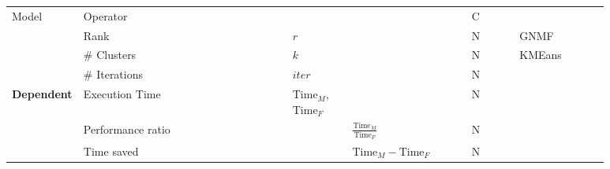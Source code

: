 \begin{tabular}{lp{0.35\linewidth}p{0.10\linewidth}>{\footnotesize}p{0.2\linewidth}p{0.08\linewidth}p{0.15\linewidth}}
    \multirow[t]{4}{*}{Model}              & Operator                                &                                   &                                         & C    &                        \\
                                           & Rank                                    & $r$                               &                                         & N    & GNMF                   \\
                                           & \# Clusters                             & $k$                               &                                         & N    & KMEans                 \\
                                           & \# Iterations                           & $iter$                            &                                         & N    &                        \\

    \multirow[t]{3}{*}{\textbf{Dependent}} & Execution Time                          & $\text{Time}_M$, $\text{Time}_F$  &                                         & N    &                        \\
                                           & Performance ratio                       &                                   & $\frac{\text{Time}_M}{\text{Time}_F}$   & N    &                        \\
                                           & Time saved                              &                                   & $\text{Time}_M - \text{Time}_F$         & N    &                        \\

    \bottomrule
\end{tabular}

